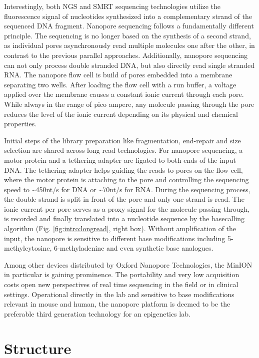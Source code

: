 Interestingly, both NGS and SMRT sequencing technologies utilize the fluorescence signal of nucleotides synthesized into a complementary strand of the sequenced DNA fragment.
Nanopore sequencing follows a fundamentally different principle.
The sequencing is no longer based on the synthesis of a second strand, as individual pores asynchronously read multiple molecules one after the other, in contrast to the previous parallel approaches.
Additionally, nanopore sequencing can not only process double stranded DNA, but also directly read single stranded RNA.
The nanopore flow cell is build of pores embedded into a membrane separating two wells.
After loading the flow cell with a run buffer, a voltage applied over the membrane causes a constant ionic current through each pore.
While always in the range of pico ampere, any molecule passing through the pore reduces the level of the ionic current depending on its physical and chemical properties.

Initial steps of the library preparation like fragmentation, end-repair and size selection are shared across long read technologies.
For nanopore sequencing, a motor protein and a tethering adapter are ligated to both ends of the input DNA.
The tethering adapter helps guiding the reads to pores on the flow-cell, where the motor protein is attaching to the pore and controlling the sequencing speed to \textasciitilde450nt/s for DNA or \textasciitilde70nt/s for RNA.
During the sequencing process, the double strand is split in front of the pore and only one strand is read.
The ionic current per pore serves as a proxy signal for the molecule passing through, is recorded and finally translated into a nucleotide sequence by the basecalling algorithm (Fig. \ref{fig:intro:longread}, right box).
Without amplification of the input, the nanopore is sensitive to different base modifications including 5-methylcytosine, 6-methyladenine and even synthetic base analogues.

Among other devices distributed by Oxford Nanopore Technologies, the MinION in particular is gaining prominence. 
The portability and very low acquisition costs open new perspectives of real time sequencing in the field or in clinical settings.
Operational directly in the lab and sensitive to base modifications relevant in mouse and human, the nanopore platform is deemed to be the preferable third generation technology for an epigenetics lab.




\section{Structure}
\label{sec:intro:structure}

